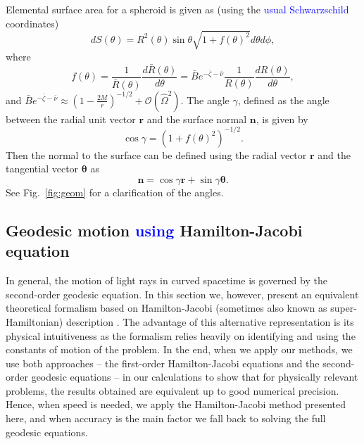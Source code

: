 \documentclass{aa}
\newcommand{\be}{\begin{equation}}
\newcommand{\ee}{\end{equation}}
\renewcommand{\vec}[1]{\ensuremath{\boldsymbol{#1}}}
\newcommand{\refe}[1]{\textcolor{blue}{{#1}}}
\newcommand{\sch}{Schwarzschild }
\newcommand{\Ob}{\ensuremath{\hat{\Omega}}}
\newcommand{\nub}{\ensuremath{\bar{\nu}}}
\newcommand{\zetab}{\ensuremath{\bar{\zeta}}}
\newcommand{\Bb}{\ensuremath{\bar{B}}}
\begin{document}
Elemental surface area for a spheroid is given as (using the \refe{usual \sch} coordinates)
\be
dS(\theta) = R^2(\theta) \sin\theta \sqrt{1 + f(\theta)^2}d\theta d\phi,
\ee
where
\be
f(\theta) = \frac{1}{\bar{R}(\theta)} \frac{d \bar{R}(\theta)}{d \theta} 
= \Bb e^{-\zetab-\nub} \frac{1}{R(\theta)} \frac{dR(\theta)}{d\theta}, 
\ee
and $\Bb e^{-\zetab-\nub} \approx \left(1-\frac{2 M}{r}\right)^{-1/2} + \mathcal{O}(\Ob^2)$.
The angle $\gamma$, defined as the angle between the radial unit vector $\vec{r}$ and the surface normal $\vec{n}$, is given by
\be
\cos\gamma = \left(1 + f(\theta)^2\right)^{-1/2}.
\ee
Then the normal to the surface can be defined using the radial vector $\vec{r}$ and the tangential vector $\vec{\theta}$ as
\be\label{eq:surf_norm}
\vec{n} = \cos\gamma \vec{r} + \sin\gamma \vec{\theta}.
\ee
See Fig.~\ref{fig:geom} for a clarification of the angles.



\subsection{Geodesic motion \refe{using} Hamilton-Jacobi equation}\label{sect:hamjac}
In general, the motion of light rays in curved spacetime is governed by the second-order geodesic equation.
In this section we, however, present an equivalent theoretical formalism based on Hamilton-Jacobi (sometimes also known as super-Hamiltonian) description \citep{MTW73, cha}.
The advantage of this alternative representation is its physical intuitiveness as the formalism relies heavily on identifying and using the constants of motion of the problem.
In the end, when we apply our methods, we use both approaches -- the first-order Hamilton-Jacobi equations and the second-order geodesic equations -- in our calculations to show that for physically relevant problems, the results obtained are equivalent up to good numerical precision.
Hence, when speed is needed, we apply the Hamilton-Jacobi method presented here, and when accuracy is the main factor we fall back to solving the full geodesic equations.
\end{document}
